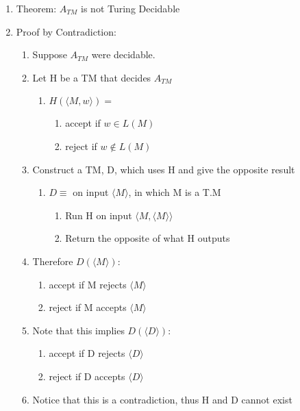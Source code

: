 \documentclass[11pt]{article}
\begin{document}
\begin{enumerate}
\item Theorem: $A_{TM}$ is not Turing Decidable
\item Proof by Contradiction:

\begin{enumerate}
\item Suppose $A_{TM}$ were decidable.
\item Let H be a TM that decides $A_{TM}$

\begin{enumerate}
\item $H(\langle M, w \rangle) =$

\begin{enumerate}
\item accept if $w \in L(M)$
\item reject if $w \notin L(M)$
\end{enumerate}

\end{enumerate}

\item Construct a TM, D, which uses H and give the opposite result

\begin{enumerate}
\item $D \equiv$ on input $\langle M \rangle$, in which M is a
             T.M

\begin{enumerate}
\item Run H on input $\langle M, \langle M \rangle \rangle$
\item Return the opposite of what H outputs
\end{enumerate}

\end{enumerate}

\item Therefore  $D(\langle M \rangle):$

\begin{enumerate}
\item accept if M rejects $\langle M\rangle$
\item reject if M accepts $\langle M\rangle$
\end{enumerate}

\item Note that this implies $D(\langle D \rangle):$

\begin{enumerate}
\item accept if D rejects $\langle D\rangle$
\item reject if D accepts $\langle D\rangle$
\end{enumerate}

\item Notice that this is a contradiction, thus H and D cannot exist
\end{enumerate}

\end{enumerate}
\end{document}

